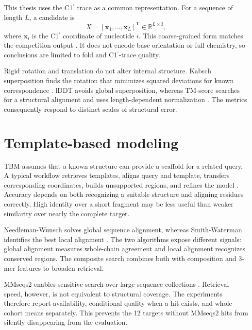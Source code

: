 \documentclass[12pt,a4paper,oneside]{report}
\newcommand{\cprime}{C1$^{\prime}$}
\newcommand{\T}{\mathrm{T}}
\begin{document}
This thesis uses the \cprime{} trace as a common representation. For a sequence of
length $L$, a candidate is
\begin{equation}
X=[\mathbf{x}_1,\ldots,\mathbf{x}_L]^\T\in\mathbb{R}^{L\times3},
\end{equation}
where $\mathbf{x}_i$ is the \cprime{} coordinate of nucleotide $i$. This coarse-grained
form matches the competition output \cite{competition_paper,kaggle_competition}. It
does not encode base orientation or full chemistry, so conclusions are limited to fold
and \cprime{}-trace quality.

Rigid rotation and translation do not alter internal structure. Kabsch superposition
finds the rotation that minimizes squared deviations for known correspondence
\cite{kabsch}. lDDT avoids global superposition, whereas TM-score searches for a
structural alignment and uses length-dependent normalization
\cite{tm_score,lddt,usalign}. The metrics consequently respond to distinct scales of
structural error.

\section{Template-based modeling}

TBM assumes that a known structure can provide a scaffold for a related query. A typical
workflow retrieves templates, aligns query and template, transfers corresponding
coordinates, builds unsupported regions, and refines the model
\cite{rna_progress_review,competition_paper}. Accuracy depends on both recognizing a
suitable structure and aligning residues correctly. High identity over a short fragment
may be less useful than weaker similarity over nearly the complete target.

Needleman-Wunsch solves global sequence alignment, whereas Smith-Waterman identifies the
best local alignment \cite{needleman_wunsch,smith_waterman}. The two algorithms expose
different signals: global alignment measures whole-chain agreement and local alignment
recognizes conserved regions. The composite search combines both with composition and
3-mer features to broaden retrieval.

MMseqs2 enables sensitive search over large sequence collections
\cite{mmseqs2}. Retrieval speed, however, is not equivalent to structural coverage. The
experiments therefore report availability, conditional quality when a hit exists, and
whole-cohort means separately. This prevents the 12 targets without MMseqs2 hits from
silently disappearing from the evaluation.
\end{document}
